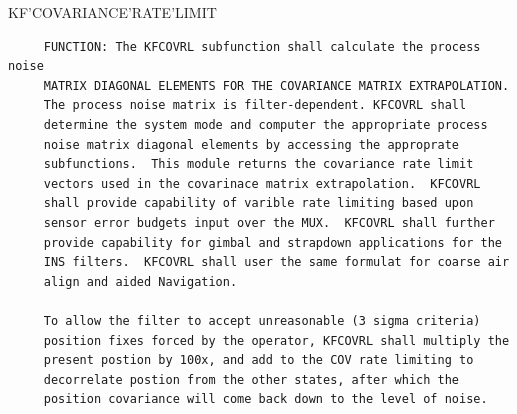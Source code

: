 \begin{frame}
KF'COVARIANCE'RATE'LIMIT
\begin{verbatim}
     FUNCTION: The KFCOVRL subfunction shall calculate the process noise
     MATRIX DIAGONAL ELEMENTS FOR THE COVARIANCE MATRIX EXTRAPOLATION.
     The process noise matrix is filter-dependent. KFCOVRL shall
     determine the system mode and computer the appropriate process
     noise matrix diagonal elements by accessing the approprate
     subfunctions.  This module returns the covariance rate limit
     vectors used in the covarinace matrix extrapolation.  KFCOVRL
     shall provide capability of varible rate limiting based upon
     sensor error budgets input over the MUX.  KFCOVRL shall further
     provide capability for gimbal and strapdown applications for the
     INS filters.  KFCOVRL shall user the same formulat for coarse air
     align and aided Navigation.

     To allow the filter to accept unreasonable (3 sigma criteria)
     position fixes forced by the operator, KFCOVRL shall multiply the
     present postion by 100x, and add to the COV rate limiting to
     decorrelate postion from the other states, after which the
     position covariance will come back down to the level of noise.

\end{verbatim}
\end{frame}
